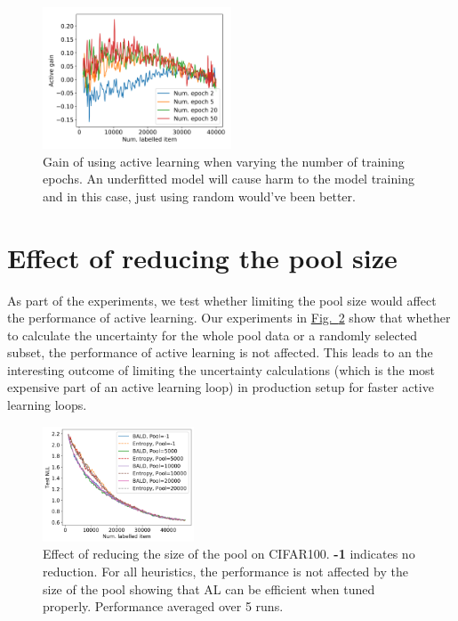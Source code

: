 \documentclass{article}
\newcommand{\figref}[1]{\hyperref[#1]{Fig.\ \ref*{#1}}}
\begin{document}
\begin{figure}
    \centering
    \includegraphics[width=0.5\textwidth]{fig/active_gain.png}
    \caption{Gain of using active learning when varying the number of training epochs. An underfitted model will cause harm to the model training and in this case, just using random would've been better.}
    \label{fig:active_gain}
\end{figure}

\section{Effect of reducing the pool size}
As part of the experiments, we test whether limiting the pool size would affect the performance of active learning. Our experiments in  \figref{fig:pool_size} show that whether to calculate the uncertainty for the whole pool data or a randomly selected subset, the performance of active learning is not affected. This leads to an the interesting outcome of limiting the uncertainty calculations (which is the most expensive part of an active learning loop) in production setup for faster active learning loops.

\begin{figure}
    \centering
    \includegraphics[width=0.4\textwidth]{fig/pol_size.png}
    \caption{Effect of reducing the size of the pool on CIFAR100. \textbf{-1} indicates no reduction. For all heuristics, the performance is not affected by the size of the pool showing that AL can be efficient when tuned properly.  Performance averaged over 5 runs.}
    \label{fig:pool_size}
\end{figure}
\end{document}
